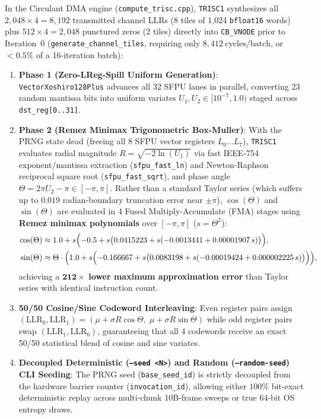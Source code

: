 \documentclass[10pt]{article}
\begin{document}
In the Circulant DMA engine (\texttt{compute\_trisc.cpp}), \texttt{TRISC1} synthesizes all $2,048 \times 4 = 8,192$ transmitted channel LLRs (8 tiles of 1,024 \texttt{bfloat16} words) plus $512 \times 4 = 2,048$ punctured zeros (2 tiles) directly into \texttt{CB\_VNODE} prior to Iteration~0 (\texttt{generate\_channel\_tiles}, requiring only $8,412\ \mathrm{cycles/batch}$, or $<0.5\%$ of a 16-iteration batch):
\begin{enumerate}[leftmargin=1.8em, itemsep=2pt]
    \item \textbf{Phase 1 (Zero-LReg-Spill Uniform Generation)}: \texttt{VectorXoshiro128Plus} advances all 32 SFPU lanes in parallel, converting 23 random mantissa bits into uniform variates $U_1, U_2 \in [10^{-7}, 1.0)$ staged across \texttt{dst\_reg[0..31]}.
    \item \textbf{Phase 2 (Remez Minimax Trigonometric Box-Muller)}: With the PRNG state dead (freeing all 8 SFPU vector registers $L_0 \dots L_7$), \texttt{TRISC1} evaluates radial magnitude $R = \sqrt{-2 \ln(U_1)}$ via fast IEEE-754 exponent/mantissa extraction (\texttt{sfpu\_fast\_ln}) and Newton-Raphson reciprocal square root (\texttt{sfpu\_fast\_sqrt}), and phase angle $\Theta = 2\pi U_2 - \pi \in [-\pi, \pi]$. Rather than a standard Taylor series (which suffers up to $0.019$ radian-boundary truncation error near $\pm\pi$), $\cos(\Theta)$ and $\sin(\Theta)$ are evaluated in 4 Fused Multiply-Accumulate (FMA) stages using \textbf{Remez minimax polynomials} over $[-\pi, \pi]$ ($s = \Theta^2$):
    \begin{align}
    \cos(\Theta) &\approx 1.0 + s\Bigl(-0.5 + s\bigl(0.0415223 + s(-0.0013441 + 0.00001907\,s)\bigr)\Bigr), \\
    \sin(\Theta) &\approx \Theta \cdot \Bigl(1.0 + s\Bigl(-0.166667 + s\bigl(0.0083198 + s(-0.00019424 + 0.000002225\,s)\bigr)\Bigr)\Bigr),
    \end{align}
    achieving a $\mathbf{212\times}$ \textbf{lower maximum approximation error} than Taylor series with identical instruction count.
    \item \textbf{50/50 Cosine/Sine Codeword Interleaving}: Even register pairs assign $(\mathrm{LLR}_0, \mathrm{LLR}_1) = (\mu + \sigma R\cos\Theta,\; \mu + \sigma R\sin\Theta)$ while odd register pairs swap $(\mathrm{LLR}_1, \mathrm{LLR}_0)$, guaranteeing that all 4 codewords receive an exact 50/50 statistical blend of cosine and sine variates.
    \item \textbf{Decoupled Deterministic (\texttt{--seed <N>}) and Random (\texttt{--random-seed}) CLI Seeding}: The PRNG seed (\texttt{base\_seed\_id}) is strictly decoupled from the hardware barrier counter (\texttt{invocation\_id}), allowing either $100\%$ bit-exact deterministic replay across multi-chunk 10B-frame sweeps or true 64-bit OS entropy draws.
\end{enumerate}
\end{document}
